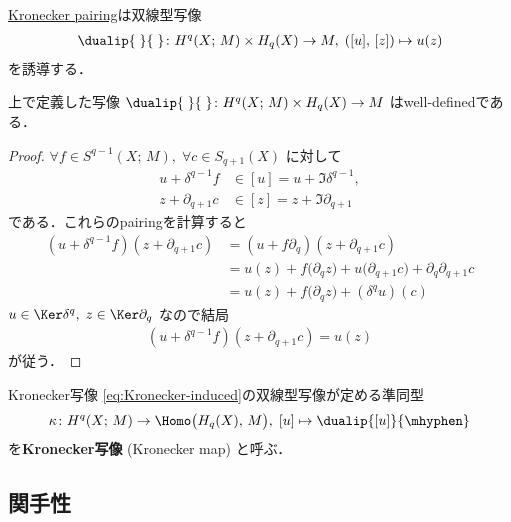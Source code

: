 \documentclass[algtopo_main]{subfiles}
\begin{document}
\hyperref[def:KroneckerPairing]{Kronecker pairing}は双線型写像
\begin{align}
    \label{eq:Kronecker-induced}
    \dualip{\;}{\;} \colon H^q(X;\, M) \times H_q(X) \to M,\; ([u],\, [z]) \mapsto u(z)
\end{align}
を誘導する．

\begin{mylem}[]{}
    上で定義した写像 $\dualip{\;}{\;} \colon H^q(X;\, M) \times H_q(X) \to M$ はwell-definedである．
\end{mylem}

\begin{proof}
    $\forall f \in S^{q-1}(X;\, M),\; \forall c \in S_{q+1}(X)$ に対して
    \begin{align}
        u + \delta^{q-1} f &\in [u] = u + \Im \delta^{q-1} , \\
        z + \partial_{q+1} c &\in [z] = z + \Im \partial_{q+1} 
    \end{align}
    である．これらのpairingを計算すると
    \begin{align}
        (u + \delta^{q-1} f)(z + \partial_{q+1} c) &= (u + f \partial_q)(z + \partial_{q+1} c) \\
        &= u(z) + f \bigl( \partial_q z \bigr) + u \bigl( \partial_{q+1}c \bigr) + \partial_q \partial_{q+1} c \\
        &= u(z) + f \bigl( \partial_q z \bigr) + (\delta^q u)(c)  
    \end{align}
    $u \in \Ker \delta^q,\; z \in \Ker \partial_q$ なので結局
    \begin{align}
        (u + \delta^{q-1} f)(z + \partial_{q+1} c) = u(z)
    \end{align}
    が従う．
\end{proof}

\begin{mydef}[label=def:KroneckerMap]{Kronecker写像}
    \eqref{eq:Kronecker-induced}の双線型写像が定める準同型
    \begin{align}
        \kappa \colon H^q(X;\, M) \to \Homo \bigl( H_q(X),\, M \bigr),\; [u] \mapsto \dualip{[u]}{\mhyphen}
    \end{align}
    を\textbf{Kronecker写像} (Kronecker map) と呼ぶ．
\end{mydef}

\subsection{関手性}
\end{document}
